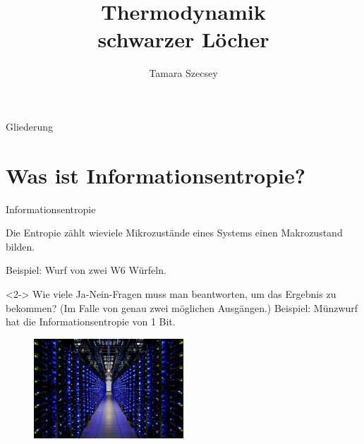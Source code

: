 \documentclass[ngerman,ph]{URbeamer}
\title{Thermodynamik \\schwarzer Löcher}
\institute{Fakultät für Physik}
\author{Tamara Szecsey}
\begin{document}
	\frame[plain]{\titlepage}
	
	\begin{frame}{Gliederung}
		\tableofcontents
	\end{frame}
	
	\section{Was ist Informationsentropie?}
	\begin{frame}{Informationsentropie}
		\begin{block}{}
			Die Entropie zählt wieviele Mikrozustände eines Systems einen Makrozustand bilden. 
			
			Beispiel: Wurf von zwei W6 Würfeln.
		\end{block}
		
		\begin{block}{}<2->
		Wie viele Ja-Nein-Fragen muss man beantworten, um das Ergebnis zu bekommen?
		(Im Falle von genau zwei möglichen Ausgängen.)
		Beispiel: Münzwurf hat die Informationsentropie von 1 Bit.	
		\end{block}
		\begin{figure} [h] 
			\begin{center}
				\includegraphics[width=0.5\textwidth]{Server}
			\end{center}
		\end{figure} 	 	%
		\hfill
	\end{frame}
	
\end{document}
